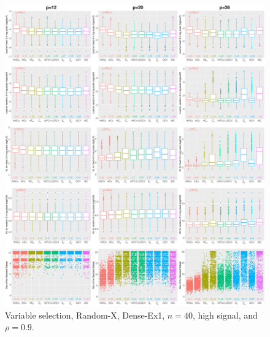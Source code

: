 \begin{figure}[!ht]
\centering
\includegraphics[width=\textwidth]{figures/supplement/randomx/subset_selection/Dense-Ex1_n40_hsnr_rho09.eps}
\caption{Variable selection, Random-X, Dense-Ex1, $n=40$, high signal, and $\rho=0.9$.}
\end{figure}
\clearpage
